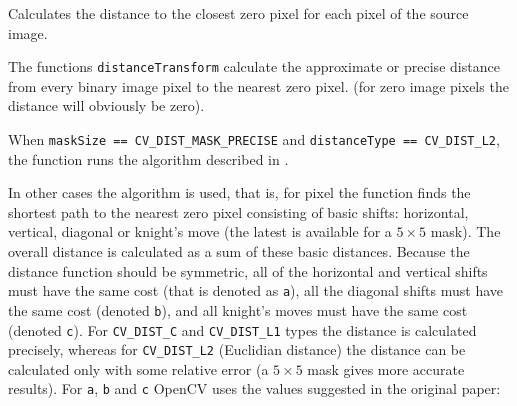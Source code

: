 Calculates the distance to the closest zero pixel for each pixel of the source image.

\begin{description}
\end{description}

The functions \texttt{distanceTransform} calculate the approximate or precise
distance from every binary image pixel to the nearest zero pixel.
(for zero image pixels the distance will obviously be zero).

When \texttt{maskSize == CV\_DIST\_MASK\_PRECISE} and \texttt{distanceType == CV\_DIST\_L2}, the function runs the algorithm described in \cite{Felzenszwalb04}.

In other cases the algorithm \cite{Borgefors86} is used, that is,
for pixel the function finds the shortest path to the nearest zero pixel
consisting of basic shifts: horizontal,
vertical, diagonal or knight's move (the latest is available for a
$5\times 5$ mask). The overall distance is calculated as a sum of these
basic distances. Because the distance function should be symmetric,
all of the horizontal and vertical shifts must have the same cost (that
is denoted as \texttt{a}), all the diagonal shifts must have the
same cost (denoted \texttt{b}), and all knight's moves must have
the same cost (denoted \texttt{c}). For \texttt{CV\_DIST\_C} and
\texttt{CV\_DIST\_L1} types the distance is calculated precisely,
whereas for \texttt{CV\_DIST\_L2} (Euclidian distance) the distance
can be calculated only with some relative error (a $5\times 5$ mask
gives more accurate results). For \texttt{a}, \texttt{b} and \texttt{c}
OpenCV uses the values suggested in the original paper:


